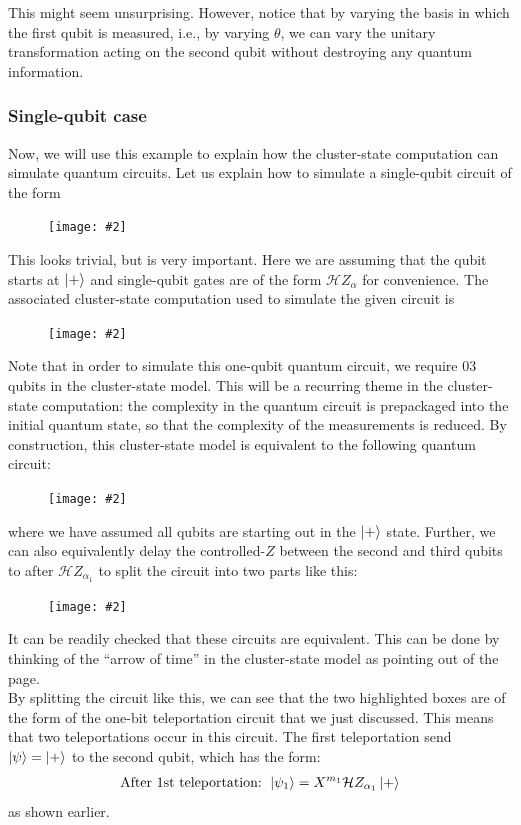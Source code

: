 \documentclass{book}
\theoremstyle{definition}
\newcommand{\had}{\mathcal{H}}
\newcommand{\al}{\alpha}
\newcommand{\fig}[2]{
	\begin{figure}[!htb]
		\centering
		\texttt{[image: \#2]}
	\end{figure}}
\begin{document}
This might seem unsurprising. However, notice that by varying the basis in which the first qubit is measured, i.e., by varying $\theta$, we can vary the unitary transformation acting on the second qubit without destroying any quantum information. 

\subsubsection{Single-qubit case}

Now, we will use this example to explain how the cluster-state computation can simulate quantum circuits. Let us explain how to simulate a single-qubit circuit of the form

\fig{0.5}{cluster3}

This looks trivial, but is very important. Here we are assuming that the qubit starts at $\ket{+}$ and single-qubit gates are of the form $\had Z_\al$ for convenience. The associated cluster-state computation used to simulate the given circuit is 

\fig{0.4}{cluster4}

Note that in order to simulate this one-qubit quantum circuit, we require 03 qubits in the cluster-state model. This will be a recurring theme in the cluster-state computation: the complexity in the quantum circuit is prepackaged into the initial quantum state, so that the complexity of the measurements is reduced. By construction, this cluster-state model is equivalent to the following quantum circuit:

\fig{0.4}{cluster5}

where we have assumed all qubits are starting out in the $\ket{+}$ state. Further, we can also equivalently delay the controlled-$Z$ between the second and third qubits to after $\had Z_{\al_1}$ to split the circuit into two parts like this:

\fig{0.4}{cluster6}

It can be readily checked that these circuits are equivalent. This can be done by thinking of the ``arrow of time'' in the cluster-state model as pointing out of the page. \\

By splitting the circuit like this, we can see that the two highlighted boxes are of the form  of the one-bit teleportation circuit that we just discussed. This means that two teleportations occur in this circuit. The first teleportation send $\ket{\psi} = \ket{+}$ to the second qubit, which has the form:
\begin{align}
\text{After 1st teleportation: } \ket{\psi_1}=   X^{m_1} \had Z_{\al_1}\ket{+}
\end{align}
as shown earlier. \\
\end{document}
